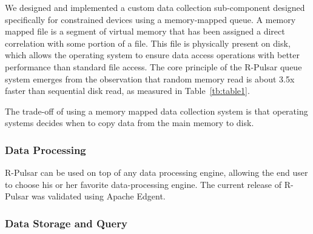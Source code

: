 We designed and implemented a custom data collection sub-component designed specifically for constrained devices using a memory-mapped queue. A memory mapped file is a segment of virtual memory that has been assigned a direct correlation with some portion of a file. This file is physically present on disk, which allows the operating system to ensure data access operations with better performance than standard file access. The core principle of the R-Pulsar queue system emerges from the observation that random memory read is about 3.5x faster than sequential disk read, as measured in Table~\ref{tb:table1}. 

The trade-off of using a memory mapped data collection system is that operating systems decides when to copy data from the main memory to disk.  
\\
\begin{table}[h!]
\centering
\caption{Measurements of Disk I/O vs RAM memory performance on a Raspberry Pi.} \label{tb:table1}
\end{table}

\subsubsection{Data Processing }

R-Pulsar can be used on top of any data processing engine, allowing the end user to choose his or her favorite data-processing engine. The current release of R-Pulsar was validated using Apache Edgent. 

\subsubsection{Data Storage and Query}

